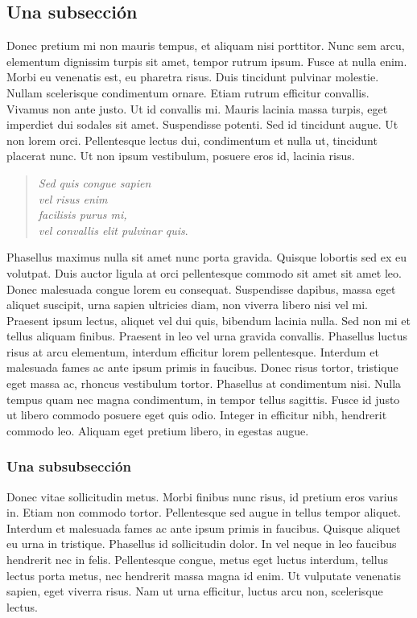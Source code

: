 \subsection*{\large Una subsección}

\noindent Donec pretium mi non mauris tempus, et aliquam nisi porttitor. Nunc sem arcu, elementum dignissim turpis sit amet, tempor rutrum ipsum. Fusce at nulla enim. Morbi eu venenatis est, eu pharetra risus. Duis tincidunt pulvinar molestie. Nullam scelerisque condimentum ornare. Etiam rutrum efficitur convallis. Vivamus non ante justo. Ut id convallis mi. Mauris lacinia massa turpis, eget imperdiet dui sodales sit amet. Suspendisse potenti. Sed id tincidunt augue. Ut non lorem orci. Pellentesque lectus dui, condimentum et nulla ut, tincidunt placerat nunc. Ut non ipsum vestibulum, posuere eros id, lacinia risus.
 
\begin{verse}
\emph{Sed quis congue sapien\\
vel risus enim\\
facilisis purus mi,\\
vel convallis elit pulvinar quis}.
\end{verse}

\noindent Phasellus maximus nulla sit amet nunc porta gravida. Quisque lobortis sed ex eu volutpat. Duis auctor ligula at orci pellentesque commodo sit amet sit amet leo. Donec malesuada congue lorem eu consequat. Suspendisse dapibus, massa eget aliquet suscipit, urna sapien ultricies diam, non viverra libero nisi vel mi. Praesent ipsum lectus, aliquet vel dui quis, bibendum lacinia nulla. Sed non mi et tellus aliquam finibus. Praesent in leo vel urna gravida convallis. Phasellus luctus risus at arcu elementum, interdum efficitur lorem pellentesque. Interdum et malesuada fames ac ante ipsum primis in faucibus. Donec risus tortor, tristique eget massa ac, rhoncus vestibulum tortor. Phasellus at condimentum nisi. Nulla tempus quam nec magna condimentum, in tempor tellus sagittis. Fusce id justo ut libero commodo posuere eget quis odio. Integer in efficitur nibh, hendrerit commodo leo. Aliquam eget pretium libero, in egestas augue.

\subsubsection{Una subsubsección}

\noindent Donec vitae sollicitudin metus. Morbi finibus nunc risus, id pretium eros varius in. Etiam non commodo tortor. Pellentesque sed augue in tellus tempor aliquet. Interdum et malesuada fames ac ante ipsum primis in faucibus. Quisque aliquet eu urna in tristique. Phasellus id sollicitudin dolor. In vel neque in leo faucibus hendrerit nec in felis. Pellentesque congue, metus eget luctus interdum, tellus lectus porta metus, nec hendrerit massa magna id enim. Ut vulputate venenatis sapien, eget viverra risus. Nam ut urna efficitur, luctus arcu non, scelerisque lectus.

